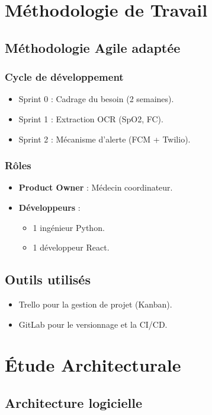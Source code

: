 \chapter{Méthodologie de Travail}

\section{Méthodologie Agile adaptée}
\subsection{Cycle de développement}
\begin{itemize}
  \item Sprint 0 : Cadrage du besoin (2 semaines).
  \item Sprint 1 : Extraction OCR (SpO2, FC).
  \item Sprint 2 : Mécanisme d’alerte (FCM + Twilio).
\end{itemize}

\subsection{Rôles}
\begin{itemize}
  \item \textbf{Product Owner} : Médecin coordinateur.
  \item \textbf{Développeurs} :
  \begin{itemize}
    \item 1 ingénieur Python.
    \item 1 développeur React.
  \end{itemize}
\end{itemize}

\section{Outils utilisés}
\begin{itemize}
  \item Trello pour la gestion de projet (Kanban).
  \item GitLab pour le versionnage et la CI/CD.
\end{itemize}

\chapter{Étude Architecturale}

\section{Architecture logicielle}
